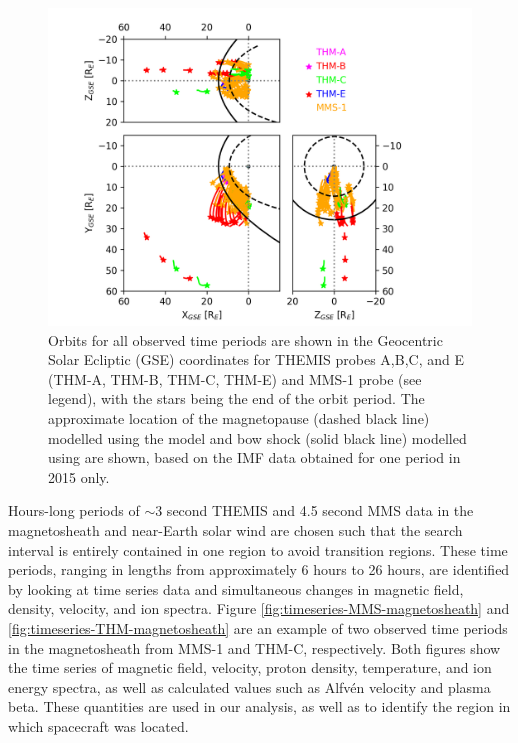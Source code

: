 \begin{figure}
    \centering
    \includegraphics[width=\textwidth]{Figures/Orbits/all_TE_orbits_xy_xz_yz.png}
    \caption{Orbits for all observed time periods are shown in the Geocentric Solar Ecliptic (GSE) coordinates for THEMIS probes A,B,C, and E (THM-A, THM-B, THM-C, THM-E) and MMS-1 probe (see legend), with the stars being the end of the orbit period. The approximate location of the magnetopause (dashed black line) modelled using the \cite{Shue:1997} model and bow shock (solid black line) modelled using \cite{SlavinHolzer:1984} are shown, based on the IMF data obtained for one period in 2015 only.}
    \label{fig:orbits-all}
\end{figure}

Hours-long periods of $\sim$3 second THEMIS and 4.5 second MMS data in the magnetosheath and near-Earth solar wind are chosen such that the search interval is entirely contained in one region to avoid transition regions. These time periods, ranging in lengths from approximately 6 hours to 26 hours, are identified by looking at time series data and simultaneous changes in magnetic field, density, velocity, and ion spectra. Figure \ref{fig:timeseries-MMS-magnetosheath} and \ref{fig:timeseries-THM-magnetosheath} are an example of two observed time periods in the magnetosheath from MMS-1 and THM-C, respectively. Both figures show the time series of magnetic field, velocity, proton density, temperature, and ion energy spectra, as well as calculated values such as Alfv\'en velocity and plasma beta. These quantities are used in our analysis, as well as to identify the region in which spacecraft was located.

